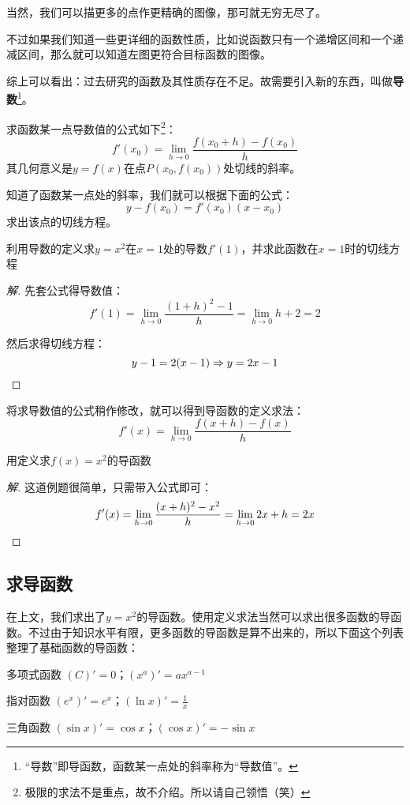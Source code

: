 当然，我们可以描更多的点作更精确的图像，那可就无穷无尽了。

不过如果我们知道一些更详细的函数性质，比如说函数只有一个递增区间和一个递减区间，那么就可以知道左图更符合目标函数的图像。

综上可以看出：过去研究的函数及其性质存在不足。故需要引入新的东西，叫做\textbf{导数}\footnote{“导数”即导函数，函数某一点处的斜率称为“导数值”。}。

求函数某一点导数值的公式如下\footnote{极限的求法不是重点，故不介绍。所以请自己领悟（笑）}：\[f'(x_0)=\lim_{h\rightarrow 0}\frac{f(x_0+h)-f(x_0)}{h}\]其几何意义是$y=f(x)$在点$P(x_0, f(x_0))$处切线的斜率。

知道了函数某一点处的斜率，我们就可以根据下面的公式：\[y-f(x_0)=f'(x_0)(x-x_0)\]求出该点的切线方程。

\begin{example}
	利用导数的定义求$y=x^2$在$x=1$处的导数$f'(1)$，并求此函数在$x=1$时的切线方程
\end{example}
\begin{proof}[解]
	先套公式得导数值：\[f'(1)=\lim_{h\rightarrow 0}\frac{(1+h)^2-1}{h}=\lim_{h\rightarrow 0}h+2=2\]

	然后求得切线方程：\[y-1=2(x-1)\Rightarrow y=2x-1\qedhere\]
\end{proof}

将求导数值的公式稍作修改，就可以得到导函数的定义求法：\[f'(x)=\lim_{h\rightarrow 0}\frac{f(x+h)-f(x)}{h}\]

\begin{example}
	用定义求$f(x)=x^2$的导函数
\end{example}
\begin{proof}[解]
	这道例题很简单，只需带入公式即可：\[f'(x)=\lim_{h\rightarrow 0}\frac{(x+h)^2-x^2}{h}=\lim_{h\rightarrow 0}2x+h=2x\qedhere\]
\end{proof}

\subsection{求导函数}
在上文，我们求出了$y=x^2$的导函数。使用定义求法当然可以求出很多函数的导函数。不过由于知识水平有限，更多函数的导函数是算不出来的，所以下面这个列表整理了基础函数的导函数：

\begin{desclist}
	\item[多项式函数] $(C)'=0$；$(x^a)'=ax^{a-1}$
	\item[指对函数] $(e^x)'=e^x$；$(\ln x)'=\frac{1}{x}$
	\item[三角函数] $(\sin x)'=\cos x$；$(\cos x)'=-\sin x$
\end{desclist}

